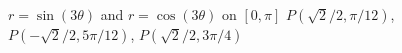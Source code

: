 {$r=\sin(3\theta)$ and $r=\cos(3\theta)$ on $[0,\pi]$}
{$P(\sqrt{2}/2,\pi/12)$, $P(-\sqrt{2}/2,5\pi/12)$, $P(\sqrt{2}/2,3\pi/4)$
}
